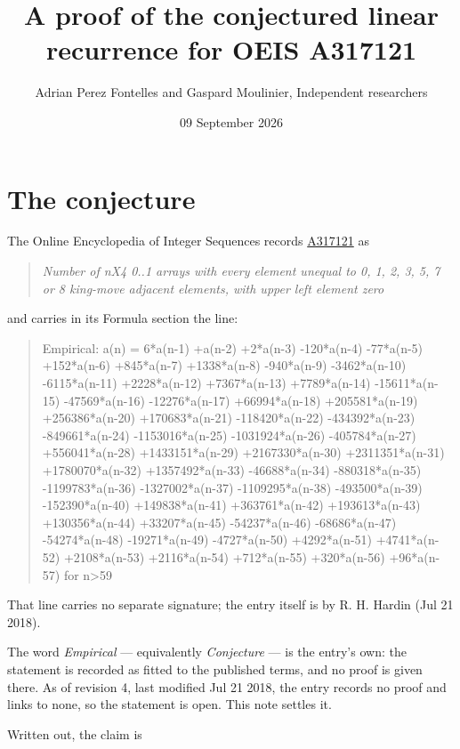 \documentclass[11pt]{article}
\title{A proof of the conjectured linear recurrence for OEIS A317121}
\author{Adrian Perez Fontelles and Gaspard Moulinier, Independent researchers}
\date{09 September 2026}
\theoremstyle{definition}
\begin{document}
\maketitle
\section{The conjecture}

The Online Encyclopedia of Integer Sequences records \href{https://oeis.org/A317121}{A317121} as

\begin{quote}\itshape Number of nX4 0..1 arrays with every element unequal to 0, 1, 2, 3, 5, 7 or 8 king-move adjacent elements, with upper left element zero\end{quote}

and carries in its Formula section the line:

\begin{quote}\ttfamily Empirical: a(n) = 6*a(n-1) +a(n-2) +2*a(n-3) -120*a(n-4) -77*a(n-5) +152*a(n-6) +845*a(n-7) +1338*a(n-8) -940*a(n-9) -3462*a(n-10) -6115*a(n-11) +2228*a(n-12) +7367*a(n-13) +7789*a(n-14) -15611*a(n-15) -47569*a(n-16) -12276*a(n-17) +66994*a(n-18) +205581*a(n-19) +256386*a(n-20) +170683*a(n-21) -118420*a(n-22) -434392*a(n-23) -849661*a(n-24) -1153016*a(n-25) -1031924*a(n-26) -405784*a(n-27) +556041*a(n-28) +1433151*a(n-29) +2167330*a(n-30) +2311351*a(n-31) +1780070*a(n-32) +1357492*a(n-33) -46688*a(n-34) -880318*a(n-35) -1199783*a(n-36) -1327002*a(n-37) -1109295*a(n-38) -493500*a(n-39) -152390*a(n-40) +149838*a(n-41) +363761*a(n-42) +193613*a(n-43) +130356*a(n-44) +33207*a(n-45) -54237*a(n-46) -68686*a(n-47) -54274*a(n-48) -19271*a(n-49) -4727*a(n-50) +4292*a(n-51) +4741*a(n-52) +2108*a(n-53) +2116*a(n-54) +712*a(n-55) +320*a(n-56) +96*a(n-57) for n>59\end{quote}

That line carries no separate signature; the entry itself is by R. H. Hardin (Jul 21 2018).

The word {\itshape Empirical} --- equivalently {\itshape Conjecture} --- is the entry's own: the statement is recorded as fitted to the published terms, and no proof is given there. As of revision 4, last modified Jul 21 2018, the entry records no proof and links to none, so the statement is open. This note settles it.

Written out, the claim is
\end{document}
